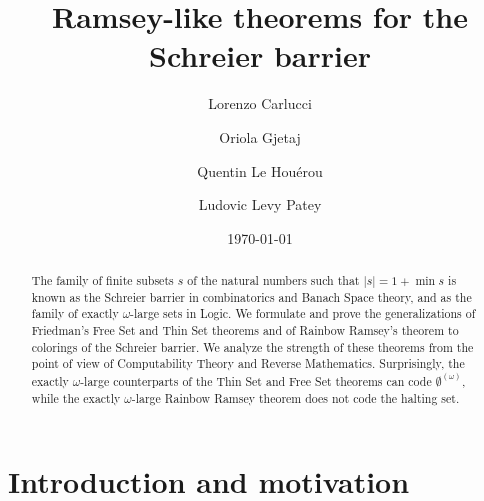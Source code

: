 \documentclass{article}
\title{Ramsey-like theorems for the Schreier barrier}
\date{\today}
\author{Lorenzo Carlucci \and Oriola Gjetaj \and Quentin Le Houérou \and Ludovic Levy Patey}
\numberwithin{theorem}{section}
\begin{document}
\maketitle


\begin{abstract}
The family of finite subsets $s$ of the natural numbers such that $|s|=1+\min s$ is known as the Schreier barrier in combinatorics and Banach Space theory, and as the family of exactly $\omega$-large sets in Logic. We formulate and prove the generalizations of Friedman's Free Set and Thin Set theorems and of Rainbow Ramsey's theorem to colorings of the Schreier barrier. We analyze the strength of these theorems from the point of view of Computability Theory and Reverse Mathematics. Surprisingly, the exactly $\omega$-large counterparts of the Thin Set and Free Set theorems can code $\emptyset^{(\omega)}$, while the exactly $\omega$-large Rainbow Ramsey theorem does not code the halting set.
\end{abstract}

\section{Introduction and motivation}
\end{document}
